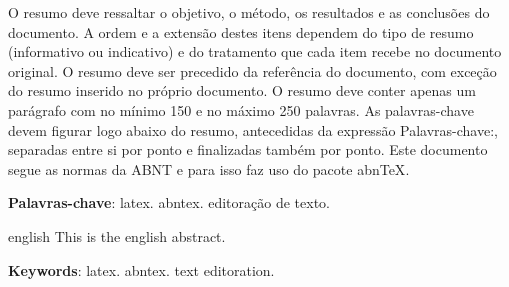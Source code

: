 \setlength{\absparsep}{18pt} 
\begin{resumo}
    O resumo deve ressaltar o objetivo, o método, os resultados e as conclusões do documento. A ordem e a extensão destes itens dependem do tipo de resumo (informativo ou indicativo) e do tratamento que cada item recebe no documento original. O resumo deve ser precedido da referência do documento, com exceção do resumo inserido no próprio documento. O resumo deve conter apenas um parágrafo com no mínimo 150 e no máximo 250 palavras. As palavras-chave devem figurar logo abaixo do resumo, antecedidas da expressão Palavras-chave:, separadas entre si por ponto e finalizadas também por ponto. Este documento segue as normas da \gls{ABNT} e para isso faz uso do pacote \gls{abnTeX}.
    
    \textbf{Palavras-chave}: latex. abntex. editoração de texto.
\end{resumo}

\begin{resumo}[Abstract]
\begin{otherlanguage*}{english}
    This is the english abstract.
\vspace{\onelineskip}

\noindent 
\textbf{Keywords}: latex. abntex. text editoration.
\end{otherlanguage*}
\end{resumo}
